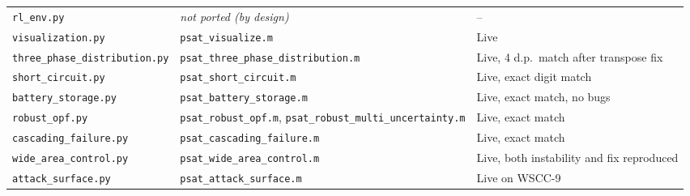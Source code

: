 \documentclass[11pt]{report}
\newcommand{\pkg}[1]{\texttt{#1}}
\theoremstyle{plain}
\theoremstyle{definition}
\theoremstyle{remark}
\begin{document}
\begin{longtable}{@{}p{5cm}p{5.5cm}p{4cm}@{}}
\pkg{rl\_\hspace{0pt}env.py} & \emph{not ported (by design)} & -- \\
\pkg{visualization\hspace{0pt}.py} & \pkg{psat\_\hspace{0pt}visualize.m} & Live \\
\pkg{three\_\hspace{0pt}phase\_\hspace{0pt}distribution.py} & \pkg{psat\_\hspace{0pt}three\_\hspace{0pt}phase\_\hspace{0pt}distribution.m} & Live, 4 d.p.\ match after transpose fix \\
\pkg{short\_\hspace{0pt}circuit.py} & \pkg{psat\_\hspace{0pt}short\_\hspace{0pt}circuit.m} & Live, exact digit match \\
\pkg{battery\_\hspace{0pt}storage.py} & \pkg{psat\_\hspace{0pt}battery\_\hspace{0pt}storage.m} & Live, exact match, no bugs \\
\pkg{robust\_\hspace{0pt}opf.py} & \pkg{psat\_\hspace{0pt}robust\_\hspace{0pt}opf.m}, \pkg{psat\_\hspace{0pt}robust\_\hspace{0pt}multi\_\hspace{0pt}uncertainty.m} & Live, exact match \\
\pkg{cascading\_\hspace{0pt}failure.py} & \pkg{psat\_\hspace{0pt}cascading\_\hspace{0pt}failure.m} & Live, exact match \\
\pkg{wide\_\hspace{0pt}area\_\hspace{0pt}control.py} & \pkg{psat\_\hspace{0pt}wide\_\hspace{0pt}area\_\hspace{0pt}control.m} & Live, both instability and fix reproduced \\
\pkg{attack\_\hspace{0pt}surface.py} & \pkg{psat\_\hspace{0pt}attack\_\hspace{0pt}surface.m} & Live on WSCC-9 \\

\end{longtable}
\end{document}
